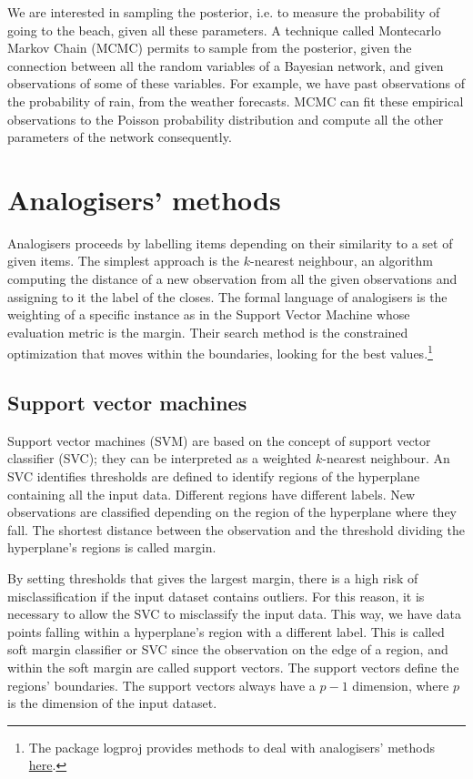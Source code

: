 We are interested in sampling the posterior, i.e. to measure the probability of going to the beach, given all these parameters. A technique called Montecarlo Markov Chain (MCMC) permits to sample from the posterior, given the connection between all the random variables of a Bayesian network, and given observations of some of these variables. For example, we have past observations of the probability of rain, from the weather forecasts. MCMC can fit these empirical observations to the Poisson probability distribution and compute all the other parameters of the network consequently.

\section{Analogisers’ methods}
Analogisers proceeds by labelling items depending on their similarity to a set of given items. The simplest approach is the $k$-nearest neighbour, an algorithm computing the distance of a new observation from all the given observations and assigning to it the label of the closes. The formal language of analogisers is the weighting of a specific instance as in the Support Vector Machine whose evaluation metric is the margin. Their search method is the constrained optimization that moves within the boundaries, looking for the best values.\footnote{The package logproj provides methods to deal with analogisers' methods \href{https://github.com/aletuf93/logproj/blob/master/logproj/M_learningMethod/analogizers_models.py}{here}.}

\subsection{Support vector machines}
Support vector machines (SVM) are based on the concept of support vector classifier (SVC); they can be interpreted as a weighted $k$-nearest neighbour. An SVC identifies thresholds are defined to identify regions of the hyperplane containing all the input data. Different regions have different labels. New observations are classified depending on the region of the hyperplane where they fall. The shortest distance between the observation and the threshold dividing the hyperplane’s regions is called margin. \par

By setting thresholds that gives the largest margin, there is a high risk of misclassification if the input dataset contains outliers. For this reason, it is necessary to allow the SVC to misclassify the input data. This way, we have data points falling within a hyperplane’s region with a different label. This is called soft margin classifier or SVC since the observation on the edge of a region, and within the soft margin are called support vectors. The support vectors define the regions’ boundaries. The support vectors always have a $p-1$ dimension, where $p$ is the dimension of the input dataset.\par

